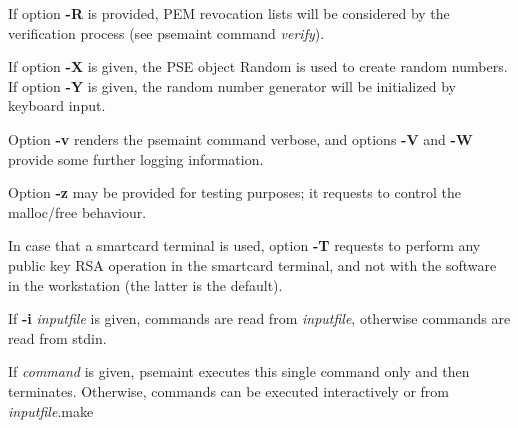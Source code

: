 If option {\bf -R} is provided, PEM revocation lists will be considered by the verification process
(see psemaint command {\em verify}).

If option {\bf -X} is given, the PSE object Random
is used to create random numbers.
If option {\bf -Y} is given, the random number generator
will be initialized by keyboard input.

Option {\bf -v} renders the psemaint command verbose, and options {\bf -V} and {\bf -W} provide some further
logging information. 

Option {\bf -z} may be provided for testing purposes; it requests to control 
the malloc/free behaviour.

In case that a smartcard terminal is used, option {\bf -T} requests to perform any public key 
RSA operation in the smartcard terminal, and not with the software in the workstation 
(the latter is the default).

If {\bf -i} {\em inputfile} is given, commands are read from {\em inputfile}, otherwise
commands are read from stdin.

If {\em command} is given, psemaint executes this single command only and then terminates. 
Otherwise, commands can be executed interactively or from {\em inputfile}.make  

